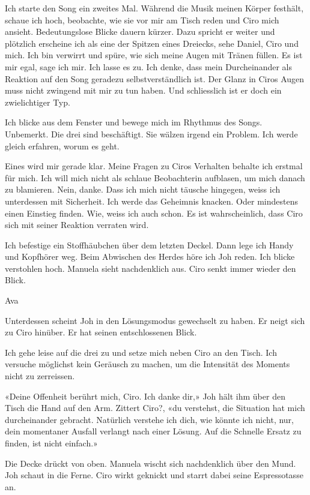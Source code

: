 Ich starte den Song ein zweites Mal. Während die Musik meinen Körper
festhält, schaue ich hoch, beobachte, wie sie vor mir am Tisch reden und
Ciro mich ansieht. Bedeutungslose Blicke dauern kürzer. Dazu spricht er
weiter und plötzlich erscheine ich als eine der Spitzen eines Dreiecks,
sehe Daniel, Ciro und mich. Ich bin verwirrt und spüre, wie sich meine
Augen mit Tränen füllen. Es ist mir egal, sage ich mir. Ich lasse es zu.
Ich denke, dass mein Durcheinander als Reaktion auf den Song geradezu
selbstverständlich ist. Der Glanz in Ciros Augen muss nicht zwingend mit
mir zu tun haben. Und schliesslich ist er doch ein zwielichtiger Typ.

Ich blicke aus dem Fenster und bewege mich im Rhythmus des Songs.
Unbemerkt. Die drei sind beschäftigt. Sie wälzen irgend ein Problem. Ich
werde gleich erfahren, worum es geht.

Eines wird mir gerade klar. Meine Fragen zu Ciros Verhalten behalte ich
erstmal für mich. Ich will mich nicht als schlaue Beobachterin
aufblasen, um mich danach zu blamieren. Nein, danke. Dass ich mich nicht
täusche hingegen, weiss ich unterdessen mit Sicherheit. Ich werde das
Geheimnis knacken. Oder mindestens einen Einstieg finden. Wie, weiss ich
auch schon. Es ist wahrscheinlich, dass Ciro sich mit seiner Reaktion
verraten wird.

Ich befestige ein Stoffhäubchen über dem letzten Deckel. Dann lege ich
Handy und Kopfhörer weg. Beim Abwischen des Herdes höre ich Joh reden.
Ich blicke verstohlen hoch. Manuela sieht nachdenklich aus. Ciro senkt
immer wieder den Blick.

Ava

Unterdessen scheint Joh in den Lösungsmodus gewechselt zu haben. Er
neigt sich zu Ciro hinüber. Er hat seinen entschlossenen Blick.

Ich gehe leise auf die drei zu und setze mich neben Ciro an den Tisch.
Ich versuche möglichst kein Geräusch zu machen, um die Intensität des
Moments nicht zu zerreissen.

«Deine Offenheit berührt mich, Ciro. Ich danke dir,» Joh hält ihm über
den Tisch die Hand auf den Arm. Zittert Ciro?, «du verstehst, die
Situation hat mich durcheinander gebracht. Natürlich verstehe ich dich,
wie könnte ich nicht, nur, dein momentaner Ausfall verlangt nach einer
Lösung. Auf die Schnelle Ersatz zu finden, ist nicht einfach.»

Die Decke drückt von oben. Manuela wischt sich nachdenklich über den
Mund. Joh schaut in die Ferne. Ciro wirkt geknickt und starrt dabei
seine Espressotasse an.

